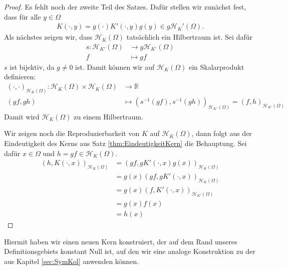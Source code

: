 \begin{proof}
Es fehlt noch der zweite Teil des Satzes. Dafür stellen wir zunächst fest, dass für alle $y \in \Omega$
\begin{align*}
K(\cdot,y) = g(\cdot) K'(\cdot,y) g(y) \in g \mathcal{H}_K' (\Omega).
\end{align*}
Als nächstes zeigen wir, dass $\mathcal{H}_K(\Omega)$ tatsächlich ein Hilbertraum ist. Sei dafür
\begin{align*}
s : \mathcal{H}_{K'} (\Omega) &\rightarrow g\mathcal{H}_{K'} (\Omega)\\
f &\mapsto gf
\end{align*}
$s$ ist bijektiv, da $g \neq 0$ ist. Damit können wir auf $\mathcal{H}_K (\Omega)$ ein Skalarprodukt definieren:
\begin{align*}
\left(\cdot, \cdot \right)_{\mathcal{H}_K(\Omega)} : \mathcal{H}_K(\Omega) \times \mathcal{H}_K(\Omega) &\rightarrow \mathbb{R}\\
(gf, gh) &\mapsto \left(s^{-1}(gf), s^{-1}(gh)\right)_{\mathcal{H}_{K'}(\Omega)} = \left( f,h \right)_{\mathcal{H}_{K'}(\Omega)}
\end{align*}
Damit wird $\mathcal{H}_K(\Omega)$ zu einem Hilbertraum. 

Wir zeigen noch die Reproduzierbarkeit von $K$ auf $\mathcal{H}_K(\Omega)$, dann folgt aus der Eindeutigkeit des Kerns aus Satz \ref{thm:EindeutigkeitKern} die Behauptung. Sei dafür $x \in \Omega$ und $h = gf \in \mathcal{H}_K (\Omega)$.
\begin{align*}
\left(h, K(\cdot,x) \right)_{\mathcal{H}_K(\Omega)} &= \left(gf, gK'(\cdot, x) g(x)\right)_{\mathcal{H}_K(\Omega)}\\
&= g(x) \left( gf, gK'(\cdot, x)\right)_{\mathcal{H}_K(\Omega)}\\
&= g(x) \left( f, K'(\cdot, x)\right)_{\mathcal{H}_{K'}(\Omega)}\\
&= g(x) f(x)\\
&= h(x)
\end{align*}
\end{proof}

Hiermit haben wir einen neuen Kern konstruiert, der auf dem Rand unseres Definitionsgebiets konstant Null ist, auf den wir eine analoge Konstruktion zu der aus Kapitel \ref{sec:SymKol} anwenden können.

